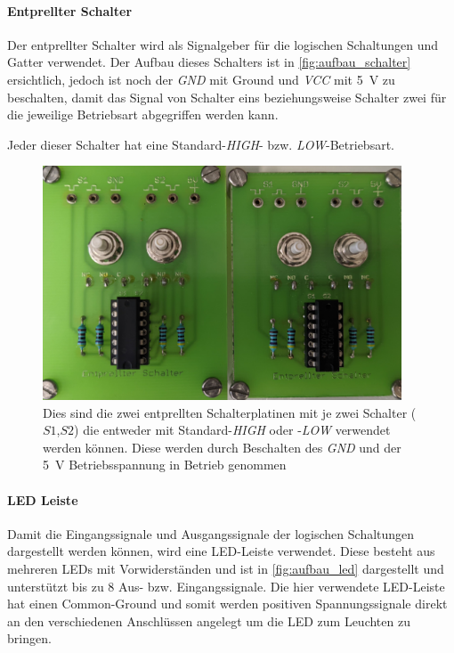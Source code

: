 \documentclass[12pt,english,ngerman]{scrartcl}
\begin{document}
\paragraph{Entprellter Schalter}\label{sec:schalter_aufbau}
Der entprellter Schalter wird als Signalgeber für die logischen Schaltungen und
Gatter verwendet. Der Aufbau dieses Schalters ist in
\autoref{fig:aufbau_schalter} ersichtlich, jedoch ist noch der \textit{GND} mit
Ground und \textit{VCC} mit \SI{5}{\volt} zu beschalten, damit das Signal von
Schalter eins beziehungsweise Schalter zwei für die jeweilige Betriebsart abgegriffen
werden kann.

Jeder dieser Schalter hat eine Standard-\textit{HIGH}- bzw.
\textit{LOW}-Betriebsart.

\begin{figure}[H]
  \centering
    \includegraphics[width=0.95\textwidth]{./figures/messungen/schalter.jpg}
  \caption{Dies sind die zwei entprellten Schalterplatinen mit je zwei Schalter
    ($S1$,$S2$) die entweder mit Standard-\textit{HIGH} oder -\textit{LOW} verwendet
    werden können. Diese werden durch Beschalten des \textit{GND} und der \SI{5}{\volt}
    Betriebsspannung in Betrieb genommen}
  \label{fig:aufbau_schalter}
\end{figure}


\paragraph{LED Leiste}
Damit die Eingangssignale und Ausgangssignale der logischen Schaltungen
dargestellt werden können, wird eine LED-Leiste verwendet. Diese besteht aus
mehreren LEDs mit Vorwiderständen und ist in \autoref{fig:aufbau_led} dargestellt und
unterstützt bis zu 8 Aus- bzw. Eingangssignale. Die hier verwendete LED-Leiste
hat einen Common-Ground und somit werden positiven Spannungssignale direkt an den
verschiedenen Anschlüssen angelegt um die LED zum Leuchten zu bringen.
\end{document}
